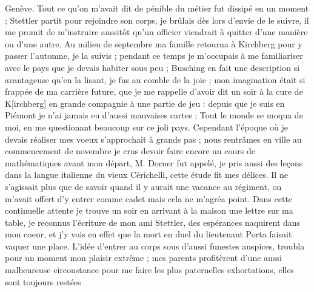 \documentclass[12pt]{article}
\begin{document}
 Genève. Tout ce qu’on m’avait dit de pénible du métier
fut dissipé en un moment ; Stettler partit pour rejoindre son corps, je brûlais dès lors d’envie de
le suivre, il me promit de m’instruire aussitôt qu’un officier viendrait à quitter d’une manière ou
d’une autre. Au milieu de septembre ma famille retourna à Kirchberg pour y passer l’automne, je la
suivis ; pendant ce temps je m’occupais à me familiariser avec le pays que je devais habiter sous
peu ; Busching en fait une description si avantageuse qu’en la lisant, je fus au comble de la joie ;
mon imagination était si frappée de ma carrière future, que je me rappelle d’avoir dit un soir à la
cure de K[irchberg] en grande compagnie à une partie de jeu : depuis que je suis en Piémont je n’ai
jamais eu d’aussi mauvaises cartes ; Tout le monde se moqua de moi, en me questionant beaucoup sur
ce joli pays. Cependant l’époque où je devais réaliser mes voeux s’approchait à grands pas ; nous
rentrâmes en ville au commencement de novembre je crus devoir faire encore un cours de mathématiques
avant mon départ, M. Dorner fut appelé, je pris aussi des leçons dans la langue italienne du vieux
Cérichelli, cette étude fit mes délices. Il ne s’agissait plus que de savoir quand il y aurait une
vacance au régiment, on m’avait offert d’y entrer comme cadet mais cela ne m’agréa point. Dans cette
continuelle attente je trouve un soir en arrivant à la maison une lettre sur ma table, je reconnus
l’écriture de mon ami Stettler, des espérances naquirent dans mon coeur, et j’y vois en effet que la
mort en duel du lieutenant Porta faisait vaquer une place. L’idée d’entrer au corps sous d’aussi
funestes auspices, troubla pour un moment mon plaisir extrême ; mes parents profitèrent d’une aussi
malheureuse circonstance pour me faire les plus paternelles exhortations, elles sont toujours
restées
\end{document}
